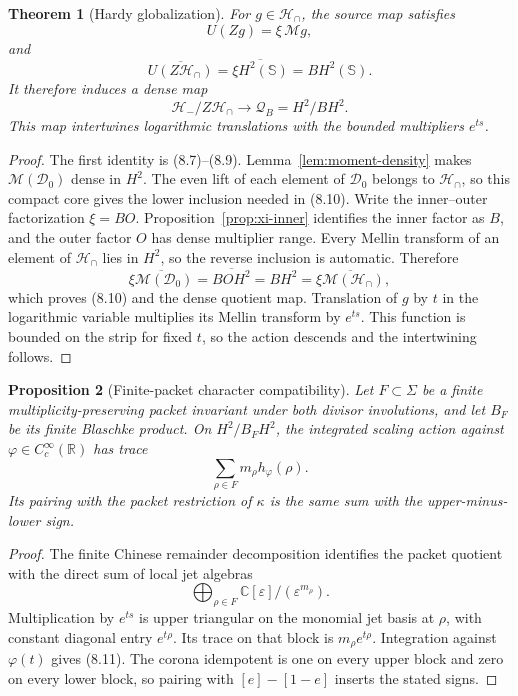 \documentclass[11pt]{article}
\newtheorem{theorem}{Theorem}[section]
\newtheorem{proposition}[theorem]{Proposition}
\theoremstyle{definition}
\theoremstyle{remark}
\newcommand{\C}{\mathbb C}
\newcommand{\R}{\mathbb R}
\newcommand{\D}{\mathcal D}
\newcommand{\Hh}{\mathcal H}
\newcommand{\Q}{\mathcal Q}
\newcommand{\cM}{\mathcal M}
\begin{document}
\begin{theorem}[Hardy globalization]\label{thm:globalization}
For $g\in\Hh_\cap$, the source map satisfies
\[
             U(Zg)=\xi\,\cM g,
\]
and
\[
       \overline{U(Z\Hh_\cap)}
       =\overline{\xi H^2(\mathbb S)}
       =BH^2(\mathbb S).                              \tag{8.10}
\]
It therefore induces a dense map
\[
                  \Hh_-/Z\Hh_\cap\longrightarrow
                  \Q_B=H^2/BH^2.
\]
This map intertwines logarithmic translations with the bounded multipliers
$e^{ts}$.
\end{theorem}

\begin{proof}
The first identity is (8.7)--(8.9).  Lemma~\ref{lem:moment-density} makes
$\cM(\D_0)$ dense in $H^2$.  The even lift of each element of $\D_0$ belongs
to $\Hh_\cap$, so this compact core gives the lower inclusion needed in (8.10).
Write the inner--outer factorization
$\xi=BO$.  Proposition~\ref{prop:xi-inner} identifies the inner factor as $B$,
and the outer factor $O$ has dense multiplier range.  Every Mellin transform of
an element of $\Hh_\cap$ lies in $H^2$, so the reverse inclusion is automatic.
Therefore
\[
 \overline{\xi\cM(\D_0)}=\overline{BOH^2}=BH^2
 =\overline{\xi\cM(\Hh_\cap)},
\]
which proves (8.10) and the dense quotient map.  Translation of $g$ by $t$ in
the logarithmic variable multiplies its Mellin transform by $e^{ts}$.  This
function is bounded on the strip for fixed $t$, so the action descends and the
intertwining follows.
\end{proof}

\begin{proposition}[Finite-packet character compatibility]
\label{prop:packet-character}
Let $F\subset\Sigma$ be a finite multiplicity-preserving packet invariant under
both divisor involutions, and let $B_F$ be its finite Blaschke product.  On
$H^2/B_FH^2$, the integrated scaling action against
$\varphi\in C_c^\infty(\R)$ has trace
\[
                       \sum_{\rho\in F}m_\rho h_\varphi(\rho). \tag{8.11}
\]
Its pairing with the packet restriction of $\kappa$ is the same sum with the
upper-minus-lower sign.
\end{proposition}

\begin{proof}
The finite Chinese remainder decomposition identifies the packet quotient with
the direct sum of local jet algebras
\[
             \bigoplus_{\rho\in F}\C[\varepsilon]/(\varepsilon^{m_\rho}).
\]
Multiplication by $e^{ts}$ is upper triangular on the monomial jet basis at
$\rho$, with constant diagonal entry $e^{t\rho}$.  Its trace on that block is
$m_\rho e^{t\rho}$.  Integration against $\varphi(t)$ gives (8.11).  The
corona idempotent is one on every upper block and zero on every lower block, so
pairing with $[e]-[1-e]$ inserts the stated signs.
\end{proof}
\end{document}
